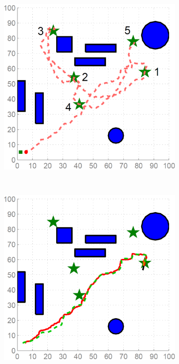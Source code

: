 \documentclass[journal]{IEEEtran}
\begin{document}
    	\begin{figure}
		\centering
		\begin{subfigure}{0.23\textwidth}
			\includegraphics[width=\textwidth]{figures/01}
			\caption{}
			\label{fig:ref_traj_h}
		\end{subfigure}
		~
		\begin{subfigure}{0.23\textwidth}
			\includegraphics[width=\textwidth]{figures/02}

\end{subfigure}
\end{figure}
\end{document}
